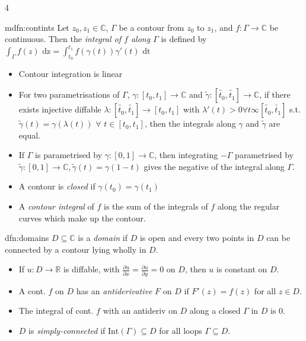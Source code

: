 \documentclass[landscape, 8pt]{extarticle}
\begin{document}
\begin{multicols*}{4}
	
	\begin{mdfn}{mdfn:contints}{ }
		Let $z_0, z_1 \in \mathbb{C}$, $\Gamma$ be a contour from $z_0$ to $z_1$, and $f: \Gamma \to \mathbb{C}$ be continuous. Then the \textit{integral of $f$ along $\Gamma$} is defined by $\int_{\Gamma} f(z) \text{ dz} = \int_{t_0}^{t_1} f(\gamma(t))\gamma'(t) \text{ dt}$
		\begin{itemize}
			\item Contour integration is linear
			\item For two parametrisations of $\Gamma$, $\gamma : [t_0, t_1] \to \mathbb{C}$ and $\tilde{\gamma}:[\tilde{t_0}, \tilde{t_1}] \to \mathbb{C}$, if there exists injective diffable $\lambda:[\tilde{t_0}, \tilde{t_1}] \to [t_0, t_1]$ with $\lambda'(t) > 0 \forall t \infty [\tilde{t_0}, \tilde{t_1}]$ s.t. $\tilde{\gamma}(t) = \gamma(\lambda(t))$ $\forall$ $t \in [t_0, t_1]$, then the integrals along $\gamma$ and $\tilde{\gamma}$ are equal.
			\item If $\Gamma$ is parametrised by $\gamma : [0,1] \to \mathbb{C}$, then integrating $-\Gamma$ parametrised by $\tilde{\gamma} : [0, 1] \to \mathbb{C}, \tilde{\gamma}(t) = \gamma(1-t)$ gives the negative of the integral along $\Gamma$.
			\item A contour is \textit{closed} if $\gamma(t_0) = \gamma(t_1)$
			\item A \textit{contour integral} of $f$ is the sum of the integrals of $f$ along the regular curves which make up the contour.
		\end{itemize}
		
	\end{mdfn}
	
	
	\begin{dfn}[Domains]{dfn:domains}{ }
		$D \subseteq \mathbb{C}$ is a \textit{domain} if $D$ is open and every two points in $D$ can be connected by a contour lying wholly in $D$.
		\begin{itemize}
			\item If $u : D \to \mathbb{R}$ is diffable, with $\frac{\partial u}{\partial x} = \frac{\partial u}{\partial y} = 0$ on $D$, then $u$ is constant on $D$.
			\item A cont. $f$ on $D$ has an \textit{antiderivative} $F$ on $D$ if $F'(z) = f(z)$ for all $z \in D$.
			\item The integral of cont. $f$ with an antideriv on $D$ along a closed $\Gamma$ in $D$ is $0$.
			\item $D$ is \textit{simply-connected} if $\text{Int}(\Gamma) \subseteq D$ for all loops $\Gamma \subseteq D$.
		\end{itemize}
		

\end{dfn}
\end{multicols*}
\end{document}
